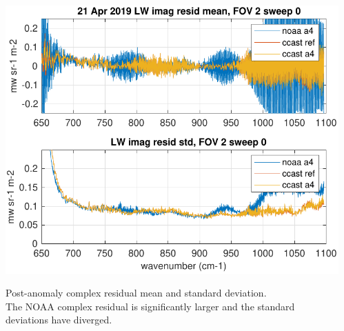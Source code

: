 \documentclass[10pt]{beamer}
\begin{document}
\begin{frame}
\begin{columns}[t]
\begin{column}{0.5\textwidth}
\end{column}
\begin{column}{0.5\textwidth}  
  \begin{centering}
  \includegraphics[width=\textwidth]{figures/LW_MW_fail_imag_fov2_sd0.pdf}
  \end{centering}\vspace{3mm}
  Post-anomaly complex residual mean and standard deviation.  \\The
  NOAA complex residual is significantly larger and the standard
  deviations have diverged.

\end{column}
\end{columns}
\end{frame}
\end{document}
